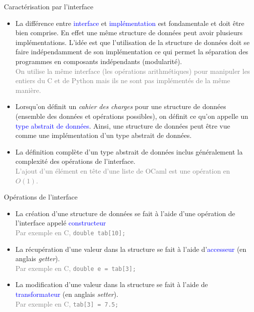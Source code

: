 \documentclass[10pt]{beamer}
\begin{document}
\begin{frame}{\Ctitle}{\stitle}
	\begin{alertblock}{Caractérisation par l'interface}
		\begin{itemize}
			\item<1-> La différence entre \textcolor{blue}{interface} et \textcolor{blue}{implémentation} est fondamentale et doit être bien comprise. En effet une même structure de données peut avoir plusieurs implémentations. L'idée est que l'utilisation de la structure de données  doit se faire indépendamment de son implémentation ce qui permet la séparation des programmes en composants indépendants (modularité).\\
				\textcolor{gray}{On utilise la même interface (les opérations arithmétiques) pour manipuler les entiers du C et de Python mais ils ne sont pas implémentés de la même manière.}
			\item<2-> Lorsqu'on définit un \textit{cahier des charges} pour une structure de données (ensemble des données et opérations possibles), on définit ce qu'on appelle un \textcolor{blue}{type abstrait de données}.  Ainsi, une structure de données peut être vue comme une implémentation d'un type abstrait de données.
			\item<3-> La définition complète d'un type abstrait de données inclus généralement la complexité des opérations de l'interface. \\
				\textcolor{gray}{L'ajout d'un élément en tête d'une liste de OCaml est une opération en $O(1)$.}
		\end{itemize}
	\end{alertblock}
\end{frame}

\begin{frame}{\Ctitle}{\stitle}
	\begin{block}{Opérations de l'interface}
		\begin{itemize}
			\item<1-> La création d'une structure de données se fait à l'aide d'une opération de l'interface appelé \textcolor{blue}{constructeur} \\
				\onslide<2->\textcolor{gray}{Par exemple en C, \texttt{double tab[10];}}
			\item<2-> La récupération d'une valeur dans la structure se fait à l'aide d'\textcolor{blue}{accesseur} (en anglais \textit{getter}).\\
				\onslide<3->\textcolor{gray}{Par exemple en C, \texttt{double e =  tab[3];}}
			\item<2-> La modification d'une valeur dans la structure se fait à l'aide de \textcolor{blue}{transformateur} (en anglais \textit{setter}).\\
				\onslide<3->\textcolor{gray}{Par exemple en C, \texttt{tab[3] = 7.5;}}
		\end{itemize}
	\end{block}
\end{frame}
\end{document}
